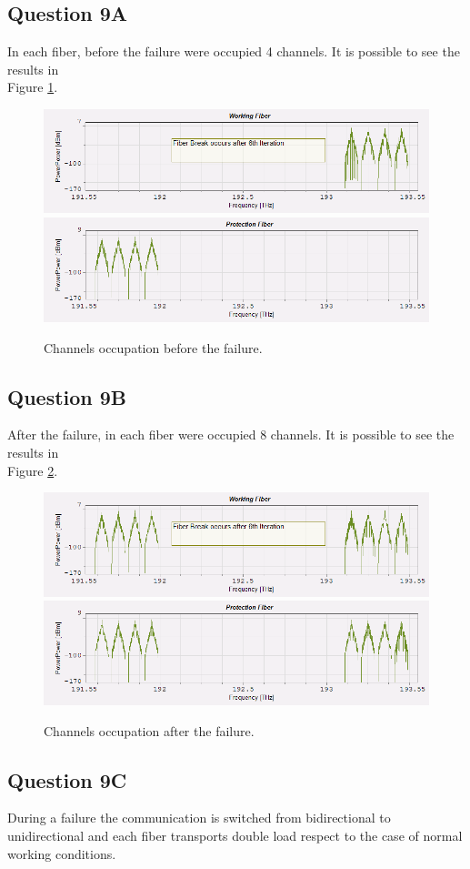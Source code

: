 \documentclass[a4paper,10pt]{report}
\begin{document}
\subsection*{Question 9A}
In each fiber, before the failure were occupied 4 channels. It is possible to see the results in\\ Figure \ref{q9a}.

\begin{figure}[!ht]
   \centering
   \includegraphics[width=12cm]{q9a1.png}\\
   \includegraphics[width=12cm]{q9a2.png}\\
   \caption{Channels occupation before the failure.}
   \label{q9a}
\end{figure}

\subsection*{Question 9B}
After the failure, in each fiber were occupied 8 channels. It is possible to see the results in\\ Figure \ref{q9b}.

\begin{figure}[!ht]
   \centering
   \includegraphics[width=12cm]{q9a3.png}\\
   \includegraphics[width=12cm]{q9a4.png}\\
   \caption{Channels occupation after the failure.}
   \label{q9b}
\end{figure}

\subsection*{Question 9C}
During a failure the communication is switched from bidirectional to unidirectional and
each fiber transports double load respect to the case of normal working conditions.
\end{document}
